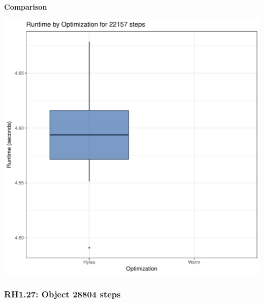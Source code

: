 \documentclass{article}\usepackage[]{graphicx}\usepackage[]{color}
\makeatletter
\def\maxwidth{ %
  \ifdim\Gin@nat@width>\linewidth
    \linewidth
  \else
    \Gin@nat@width
  \fi
}
\newenvironment{knitrout}{}{} %
\makeatother
\begin{document}
 \textbf{Comparison}
  
\begin{knitrout}
\color{fgcolor}
\includegraphics[width=\maxwidth]{figure/RH1_steps22157-1} 

\end{knitrout}


\subsubsection{RH1.27: Object 28804 steps}
\end{document}
